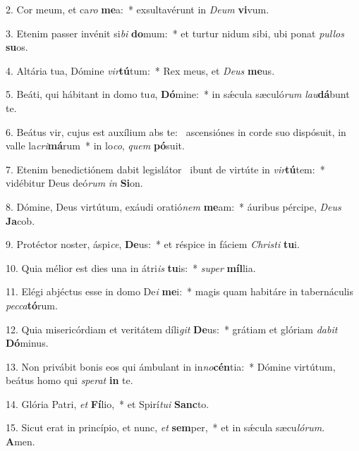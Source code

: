 2. Cor meum, et ca\textit{ro} \textbf{me}a:~*  exsultavérunt in \textit{De}\textit{um} \textbf{vi}vum.\

3. Etenim passer invénit si\textit{bi} \textbf{do}mum:~*  et turtur nidum sibi, ubi ponat \textit{pul}\textit{los} \textbf{su}os.\

4. Altária tua, Dómine \textit{vir}\textbf{tú}tum:~*  Rex meus, et \textit{De}\textit{us} \textbf{me}us.\

5. Beáti, qui hábitant in domo tu\textit{a}, \textbf{Dó}mine:~*  in sǽcula sæculó\textit{rum} \textit{lau}\textbf{dá}bunt te.\

6. Beátus vir, cujus est auxílium abs te: \dag\  ascensiónes in corde suo dispósuit, in valle la\textit{cri}\textbf{má}rum~*  in lo\textit{co}, \textit{quem} \textbf{pó}suit.\

7. Etenim benedictiónem dabit legislátor \dag\  ibunt de virtúte in \textit{vir}\textbf{tú}tem:~*  vidébitur Deus deó\textit{rum} \textit{in} \textbf{Si}on.\

8. Dómine, Deus virtútum, exáudi oratió\textit{nem} \textbf{me}am:~*  áuribus pércipe, \textit{De}\textit{us} \textbf{Ja}cob.\

9. Protéctor noster, áspi\textit{ce}, \textbf{De}us:~*  et réspice in fáciem \textit{Chris}\textit{ti} \textbf{tu}i.\

10. Quia mélior est dies una in átri\textit{is} \textbf{tu}is:~*  \textit{su}\textit{per} \textbf{míl}lia.\

11. Elégi abjéctus esse in domo De\textit{i} \textbf{me}i:~*  magis quam habitáre in tabernáculis \textit{pec}\textit{ca}\textbf{tó}rum.\

12. Quia misericórdiam et veritátem díli\textit{git} \textbf{De}us:~*  grátiam et glóriam \textit{da}\textit{bit} \textbf{Dó}minus.\

13. Non privábit bonis eos qui ámbulant in in\textit{no}\textbf{cén}tia:~*  Dómine virtútum, beátus homo qui \textit{spe}\textit{rat} \textbf{in} te.\

14. Glória Patri, \textit{et} \textbf{Fí}lio,~*  et Spirí\textit{tu}\textit{i} \textbf{Sanc}to.\

15. Sicut erat in princípio, et nunc, \textit{et} \textbf{sem}per,~*  et in sǽcula sæcu\textit{ló}\textit{rum}. \textbf{A}men.\

